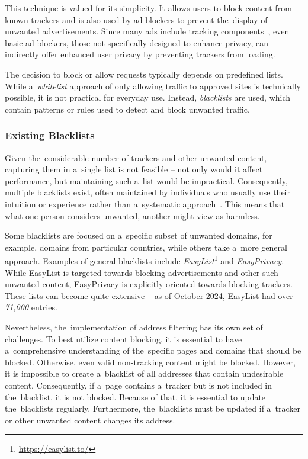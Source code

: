 This technique is valued for its simplicity. It allows users to block content from known trackers and is also used by ad blockers to prevent the~display of unwanted advertisements. Since many ads include tracking components~\cite{ad-trackers}, even basic ad blockers, those not specifically designed to enhance privacy, can indirectly offer enhanced user privacy by preventing trackers from loading.

The decision to block or allow requests typically depends on predefined lists. While a~\emph{whitelist} approach of only allowing traffic to approved sites is technically possible, it is not practical for everyday use. Instead, \emph{blacklists} are used, which contain patterns or rules used to detect and block unwanted traffic.

\subsubsection{Existing Blacklists}
\label{existing-blacklists}

Given the~considerable number of trackers and other unwanted content, capturing them in a~single list is not feasible -- not only would it affect performance, but maintaining such a~list would be impractical. Consequently, multiple blacklists exist, often maintained by individuals who usually use their intuition or experience rather than a~systematic approach~\cite{domain-blocking}. This means that what one person considers unwanted, another might view as harmless.

Some blacklists are focused on a~specific subset of unwanted domains, for example, domains from particular countries, while others take a~more general approach. Examples of general blacklists include \textit{EasyList}\footnote{\label{easylistnote}\url{https://easylist.to/}} and \textit{EasyPrivacy}. While EasyList is targeted towards blocking advertisements and other such unwanted content, EasyPrivacy is explicitly oriented towards blocking trackers. These lists can become quite extensive -- as of October 2024, EasyList had over \textit{71,000} entries.

Nevertheless, the~implementation of address filtering has its own set of challenges. To best utilize content blocking, it is essential to have a~comprehensive understanding of the~specific pages and domains that should be blocked. Otherwise, even valid non-tracking content might be blocked. However, it is impossible to create a~blacklist of all addresses that contain undesirable content. Consequently, if a~page contains a~tracker but is not included in the~blacklist, it is not blocked. Because of that, it is essential to update the~blacklists regularly. Furthermore, the~blacklists must be updated if a~tracker or other unwanted content changes its address.

